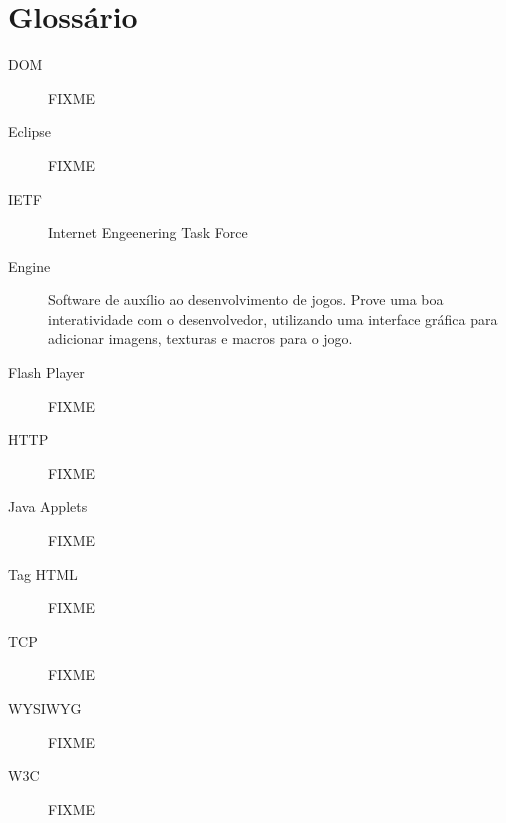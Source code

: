 
\section*{Glossário}

\begin{description}
\item[DOM ] FIXME
\item[Eclipse ] FIXME
\item[IETF ] Internet Engeenering Task Force
\item[Engine ] Software de auxílio ao desenvolvimento de jogos. Prove
uma boa interatividade com o desenvolvedor, utilizando uma interface
gráfica para adicionar imagens, texturas e macros para o jogo.
\item[Flash Player ] FIXME
\item[HTTP ] FIXME
\item[Java Applets ] FIXME
\item[Tag HTML ] FIXME
\item[TCP ] FIXME
\item[WYSIWYG ] FIXME
\item[W3C ] FIXME

\end{description}

\newpage
